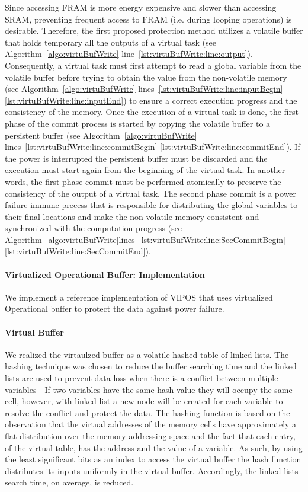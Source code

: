 		Since accessing FRAM is more energy expensive and slower than accessing SRAM, preventing frequent access to FRAM (i.e. during looping operations) is desirable. Therefore, the first proposed protection method utilizes a volatile buffer that holds temporary all the outputs of a virtual task (see Algorithm~\ref{algo:virtuBufWrite} line~\ref{lst:virtuBufWrite:line:output}). Consequently, a virtual task must first attempt to read a global variable from the volatile buffer before trying to obtain the value from the non-volatile memory (see Algorithm~\ref{algo:virtuBufWrite} lines~\ref{lst:virtuBufWrite:line:inputBegin}-\ref{lst:virtuBufWrite:line:inputEnd}) to ensure a correct execution progress and the consistency of the memory. Once the execution of a virtual task is done, the first phase of the commit process is started by copying the volatile buffer to a persistent buffer (see Algorithm~\ref{algo:virtuBufWrite} lines~\ref{lst:virtuBufWrite:line:commitBegin}-\ref{lst:virtuBufWrite:line:commitEnd}). If the power is interrupted the persistent buffer must be discarded and the execution must start again from the beginning of the virtual task. In another words, the first phase commit must be performed atomically to preserve the consistency of the output of a virtual task. The second phase commit is a power failure immune precess that is responsible for distributing the global variables to their final locations and make the non-volatile memory consistent and synchronized with the computation progress (see Algorithm~\ref{algo:virtuBufWrite}lines~\ref{lst:virtuBufWrite:line:SecCommitBegin}-\ref{lst:virtuBufWrite:line:SecCommitEnd}).


	\paragraph{Virtualized Operational Buffer: Implementation} 

		We implement a reference implementation of VIPOS that uses virtualized Operational buffer to protect the data against power failure. 
		\paragraph{Virtual Buffer}
			We realized the virtaulzed buffer as a volatile hashed table of linked lists. The hashing technique was chosen to reduce the buffer searching time and the linked lists are used to prevent data loss when there is a conflict between multiple variables---If two variables have the same hash value they will occupy the same cell, however, with linked list a new node will be created for each variable to resolve the conflict and protect the data. The hashing function is based on the observation that the virtual addresses of the memory cells have approximately a flat distribution over the memory addressing space and the fact that each entry, of the virtual table, has the address and the value of a variable. As such, by using the least significant bits as an index to access the virtual buffer the hash function distributes its inputs uniformly in the virtual buffer. Accordingly, the linked lists search time, on average, is reduced. 

